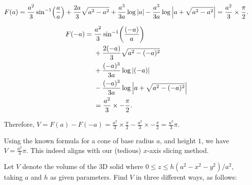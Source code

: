 \documentclass{exam}
\newcommand\starscore[2]{%
  \pgfmathsetmacro\pgfxa{#1 + 1}%
  \tikzstyle{scorestars}=[star, star points=5, star point ratio=2.5, draw, inner sep=0.12em, anchor=outer point 3]%
  \begin{tikzpicture}[baseline=2pt]
    \foreach \i in {1, ..., #2} {
      \pgfmathparse{\i<=#1 ? "black" : "white"}
      \edef\starcolor{\pgfmathresult}
      \draw (\i*1em, 0) node[name=star\i, scorestars, fill=\starcolor, semithick]  {};
    }
    \pgfmathparse{#1>int(#1) ? int(#1+1) : 0}
    \let\partstar=\pgfmathresult
    \ifnum\partstar>0
      \pgfmathsetmacro\starpart{#1-(int(#1)}
      \path [clip] ($(star\partstar.outer point 3)!(star\partstar.outer point 2)!(star\partstar.outer point 4)$) rectangle 
      ($(star\partstar.outer point 2 |- star\partstar.outer point 1)!\starpart!(star\partstar.outer point 1 -| star\partstar.outer point 5)$);
      \fill (\partstar*1em, 0) node[scorestars, fill=black]  {};
    \fi
  \end{tikzpicture}%
}
\newcommand{\lr}[3]{\left#1{\mathstrut#3}\right#2}
\newcommand{\abs}[1]{\lr\vert\vert{#1}}
\begin{document}
\begin{questions}
\begin{parts}
\begin{solution}
    \[ F(a) = \frac{a^2}3\sin^{-1}\!\lr(){\frac aa}
   + \frac{2a}{3}\sqrt{a^2-a^2}
   + \frac{a^3}{3a}\log\abs{a}
   - \frac{a^3}{3a}\log\abs{a+\sqrt{a^2-a^2}} = \frac{a^2}{3} \times \frac{\pi}{2}. \]

    
    \[
        \begin{aligned}
        F(-a) = {} &\frac{a^2}3\sin^{-1}\!\lr(){\frac {(-a)}{a}} \\
                    &+ \frac{2(-a)}{3}\sqrt{a^2-(-a)^2} \\
                    &+ \frac{(-a)^3}{3a}\log\abs{(-a)} \\
                    &- \frac{(-a)^3}{3a}\log\abs{a+\sqrt{a^2-(-a)^2}} \\
                    &= \frac{a^2}{3} \times -\frac{\pi}{2}.
        \end{aligned}
    \]

    Therefore, $V = F(a) - F(-a) = \frac{a^2}{3} \times \frac{\pi}{2} - \frac{a^2}{3} \times - \frac{\pi}{2} = \frac{a^2}{3}\pi$.

    Using the known formula for a cone of base radius $a$, and height $1$, we have $V = \frac{a^2}{3}\pi$. This indeed aligns with our (tedious) $x$-axis slicing method. 
    
\end{solution}



\end{parts}

\goodbreak 

\question[4]
Let $V$ denote the volume of the 3D solid where 
$0 \le z \le h(a^2 - x^2 - y^2)/a^2$,
taking $a$ and $h$ as given parameters.
Find $V$ in three different ways, as follows:

\end{questions}
\end{document}
